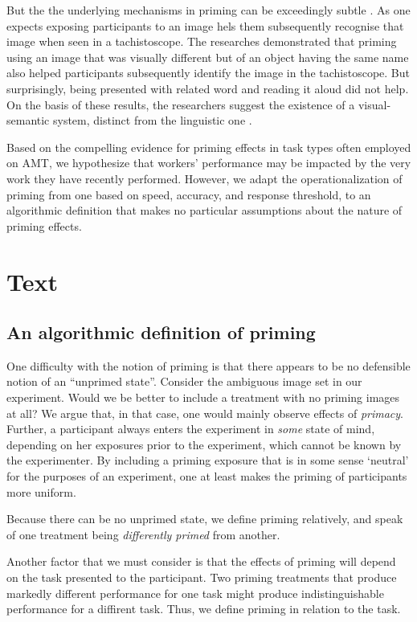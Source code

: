 \documentclass[a4paper]{report}
\begin{document}
But the the underlying mechanisms in priming
can be exceedingly subtle \cite{BJOP:BJOP1796}.  As one expects exposing 
participants to an image hels them subsequently recognise that 
image when seen in a tachistoscope.  The researches demonstrated that priming 
using an image that was visually different but of an object having the same 
name also helped participants subsequently identify the image in the 
tachistoscope.  But surprisingly, being presented with related word and 
reading it aloud did not help.  On the basis of these 
results, the researchers suggest the existence of a visual-semantic system,
distinct from the linguistic one \cite{BJOP:BJOP1796}.

Based on the compelling evidence for priming effects in task types often 
employed on AMT, we hypothesize that workers' performance may be impacted
by the very work they have recently performed.  However, we adapt the 
operationalization of priming from one based on speed, accuracy, and 
response threshold, to an algorithmic definition that makes no particular
assumptions about the nature of priming effects.
	

\section*{Text}
\subsection*{An algorithmic definition of priming}
One difficulty with the notion of priming is that there appears to be no 
defensible notion of an ``unprimed state''.  Consider the ambiguous image set 
in our experiment.  Would we be better to include a treatment with no
priming images at all?  We argue that, in that case, one would mainly observe  
effects of \textit{primacy}.  
Further, a participant always enters the experiment in \textit{some} state of 
mind, depending on her exposures prior to the experiment, which cannot be 
known by the experimenter.  By including a priming exposure that is in some 
sense `neutral' for the purposes of an experiment, one at least makes the 
priming of participants more uniform.  

Because there
can be no unprimed state, we define priming relatively, and speak of one
treatment being \textit{differently primed} from another.

Another factor that we must consider is that the effects of priming will
depend on the task presented to the participant.  Two priming treatments that
produce markedly different performance for one task might produce 
indistinguishable performance for a diffirent task.  Thus, we define priming
in relation to the task.
\end{document}
